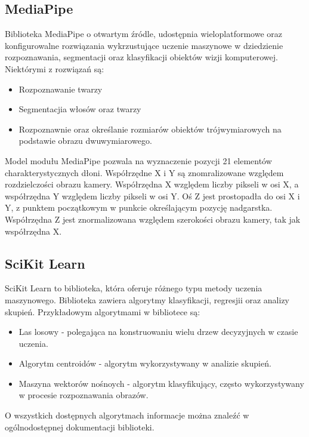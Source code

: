\subsection{MediaPipe}

\quad Biblioteka MediaPipe o otwartym źródle, udostępnia wieloplatformowe oraz konfigurowalne rozwiązania wykrzustujące uczenie maszynowe w dziedzienie rozpoznawania, segmentacji oraz klasyfikacji obiektów wizji komputerowej. Niektórymi z rozwiązań są:

\begin{itemize}
    \item Rozpoznawanie twarzy
    \item Segmentacjia włosów oraz twarzy
    \item Rozpoznawnie oraz określanie rozmiarów obiektów trójwymiarowych 
            na podstawie obrazu dwuwymiarowego. 
\end{itemize}

\quad Model modułu MediaPipe pozwala na wyznaczenie pozycji 21 elementów charakterystycznych dłoni. Współrzędne X i Y są znomralizowane względem rozdzielczości obrazu kamery. Współrzędna X względem liczby pikseli w osi X, a współrzędna Y względem liczby pikseli w osi Y. Oś Z jest prostopadła do osi X i Y, z punktem początkowym w punkcie określającym pozycję nadgarstka. Współrzędna Z jest znormalizowana względem szerokości obrazu kamery, tak jak współrzędna X. 

\subsection{SciKit Learn}

\quad SciKit Learn to biblioteka, która oferuje różnego typu metody uczenia maszynowego. Biblioteka zawiera algorytmy klasyfikacji, regresjii oraz analizy skupień. Przykładowym algorytmami w bibliotece są:
\begin{itemize}
    \item Las losowy - polegająca na konstruowaniu wielu drzew decyzyjnych w czasie uczenia. 
    \item Algorytm centroidów - algorytm wykorzystywany w analizie skupień.
    \item Maszyna wektorów nośnoych - algorytm klasyfikujący, często wykorzystywany w procesie rozpoznawania obrazów. 
\end{itemize}
O wszystkich dostępnych algorytmach informacje można znaleźć w ogólnodostępnej dokumentacji biblioteki. 


